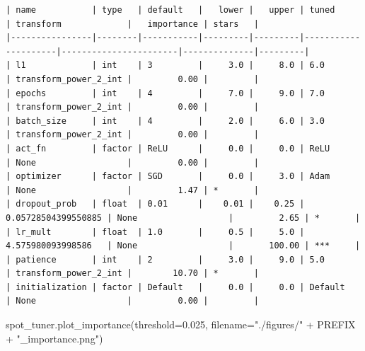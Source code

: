 \documentclass[
  letterpaper,
  DIV=11,
  numbers=noendperiod]{scrreprt}
\newenvironment{Shaded}{\begin{snugshade}}{\end{snugshade}}
\newcommand{\FloatTok}[1]{\textcolor[rgb]{0.68,0.00,0.00}{#1}}
\newcommand{\NormalTok}[1]{\textcolor[rgb]{0.00,0.23,0.31}{#1}}
\newcommand{\OperatorTok}[1]{\textcolor[rgb]{0.37,0.37,0.37}{#1}}
\newcommand{\StringTok}[1]{\textcolor[rgb]{0.13,0.47,0.30}{#1}}
\begin{document}
\begin{verbatim}
| name           | type   | default   |   lower |   upper | tuned               | transform             |   importance | stars   |
|----------------|--------|-----------|---------|---------|---------------------|-----------------------|--------------|---------|
| l1             | int    | 3         |     3.0 |     8.0 | 6.0                 | transform_power_2_int |         0.00 |         |
| epochs         | int    | 4         |     7.0 |     9.0 | 7.0                 | transform_power_2_int |         0.00 |         |
| batch_size     | int    | 4         |     2.0 |     6.0 | 3.0                 | transform_power_2_int |         0.00 |         |
| act_fn         | factor | ReLU      |     0.0 |     0.0 | ReLU                | None                  |         0.00 |         |
| optimizer      | factor | SGD       |     0.0 |     3.0 | Adam                | None                  |         1.47 | *       |
| dropout_prob   | float  | 0.01      |    0.01 |    0.25 | 0.05728504399550885 | None                  |         2.65 | *       |
| lr_mult        | float  | 1.0       |     0.5 |     5.0 | 4.575980093998586   | None                  |       100.00 | ***     |
| patience       | int    | 2         |     3.0 |     9.0 | 5.0                 | transform_power_2_int |        10.70 | *       |
| initialization | factor | Default   |     0.0 |     0.0 | Default             | None                  |         0.00 |         |
\end{verbatim}

\begin{Shaded}
\begin{Highlighting}[]
\NormalTok{spot\_tuner.plot\_importance(threshold}\OperatorTok{=}\FloatTok{0.025}\NormalTok{,}
\NormalTok{    filename}\OperatorTok{=}\StringTok{"./figures/"} \OperatorTok{+}\NormalTok{ PREFIX }\OperatorTok{+} \StringTok{"\_importance.png"}\NormalTok{)}
\end{Highlighting}
\end{Shaded}
\end{document}
